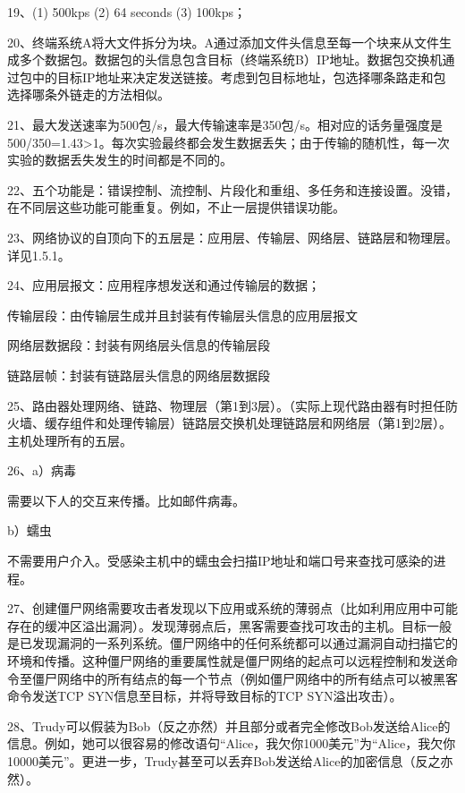 \documentclass[11pt,UTF8,twoside]{article}
\begin{document}
    19、(1) 500kps
    (2) 64 seconds
    (3) 100kps；
    
    20、终端系统A将大文件拆分为块。A通过添加文件头信息至每一个块来从文件生成多个数据包。数据包的头信息包含目标（终端系统B）IP地址。数据包交换机通过包中的目标IP地址来决定发送链接。考虑到包目标地址，包选择哪条路走和包选择哪条外链走的方法相似。
    
    21、最大发送速率为500包/s，最大传输速率是350包/s。相对应的话务量强度是500/350=1.43>1。每次实验最终都会发生数据丢失；由于传输的随机性，每一次实验的数据丢失发生的时间都是不同的。
    
    22、五个功能是：错误控制、流控制、片段化和重组、多任务和连接设置。没错，在不同层这些功能可能重复。例如，不止一层提供错误功能。
    
    23、网络协议的自顶向下的五层是：应用层、传输层、网络层、链路层和物理层。详见1.5.1。
    
    24、应用层报文：应用程序想发送和通过传输层的数据；
    
    传输层段：由传输层生成并且封装有传输层头信息的应用层报文
    
    网络层数据段：封装有网络层头信息的传输层段
    
    链路层帧：封装有链路层头信息的网络层数据段
    
    25、路由器处理网络、链路、物理层（第1到3层）。（实际上现代路由器有时担任防火墙、缓存组件和处理传输层）链路层交换机处理链路层和网络层（第1到2层）。主机处理所有的五层。
    
    26、a）病毒
    
    需要以下人的交互来传播。比如邮件病毒。
    
    b）蠕虫
    
    不需要用户介入。受感染主机中的蠕虫会扫描IP地址和端口号来查找可感染的进程。
    
    27、创建僵尸网络需要攻击者发现以下应用或系统的薄弱点（比如利用应用中可能存在的缓冲区溢出漏洞）。发现薄弱点后，黑客需要查找可攻击的主机。目标一般是已发现漏洞的一系列系统。僵尸网络中的任何系统都可以通过漏洞自动扫描它的环境和传播。这种僵尸网络的重要属性就是僵尸网络的起点可以远程控制和发送命令至僵尸网络中的所有结点的每一个节点（例如僵尸网络中的所有结点可以被黑客命令发送TCP SYN信息至目标，并将导致目标的TCP SYN溢出攻击）。
    
    28、Trudy可以假装为Bob（反之亦然）并且部分或者完全修改Bob发送给Alice的信息。例如，她可以很容易的修改语句“Alice，我欠你1000美元”为“Alice，我欠你10000美元”。更进一步，Trudy甚至可以丢弃Bob发送给Alice的加密信息（反之亦然）。
    
    \newpage
    \pagestyle{fancy}
    \fancyhf{}  %
    \pagestyle{fancy}    
\end{document}
